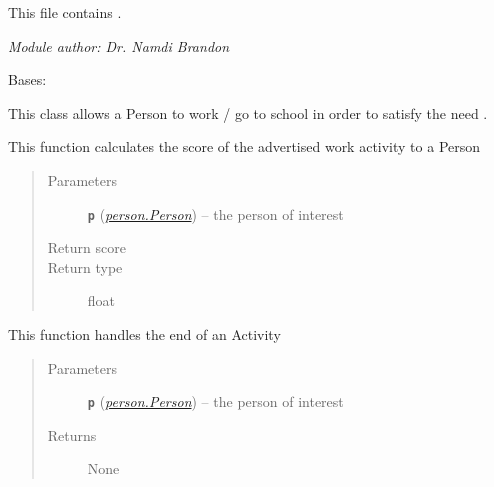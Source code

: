 \documentclass[letterpaper,10pt,english]{sphinxmanual}
\begin{document}
This file contains {\hyperref[work:work.Work]{\emph{}}}.

\emph{Module author: Dr. Namdi Brandon}

\begin{fulllineitems}
\label{work:work.Work}
Bases: {\hyperref[activity:activity.Activity]{\emph{}}}

This class allows a Person to work / go to school in order to satisfy the need     {\hyperref[income:income.Income]{\emph{}}}.

\begin{fulllineitems}
\label{work:work.Work.advertise}
This function calculates the score of the advertised work activity to a Person
\begin{quote}\begin{description}
\item[{Parameters}] \leavevmode
\textbf{\texttt{p}} ({\hyperref[person:person.Person]{\emph{\emph{person.Person}}}}) -- the person of interest

\item[{Return score}] \leavevmode
\item[{Return type}] \leavevmode
float

\end{description}\end{quote}

\end{fulllineitems}


\begin{fulllineitems}
\label{work:work.Work.end}
This function handles the end of an Activity
\begin{quote}\begin{description}
\item[{Parameters}] \leavevmode
\textbf{\texttt{p}} ({\hyperref[person:person.Person]{\emph{\emph{person.Person}}}}) -- the person of interest

\item[{Returns}] \leavevmode
None

\end{description}\end{quote}


\end{fulllineitems}
\end{fulllineitems}
\end{document}
